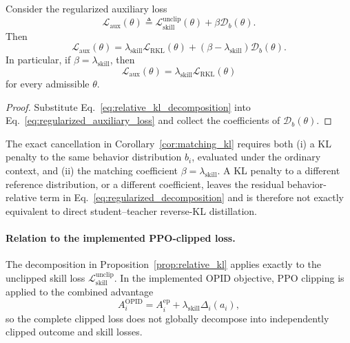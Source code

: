 \begin{corollary}
\label{cor:matching_kl}
Consider the regularized auxiliary loss
\begin{equation}
 \mathcal L_{\mathrm{aux}}(\theta)
 \triangleq
 \mathcal L_{\mathrm{skill}}^{\mathrm{unclip}}(\theta)
 +
 \beta\mathcal D_b(\theta).
\label{eq:regularized_auxiliary_loss}
\end{equation}
Then
\begin{equation}
 \mathcal L_{\mathrm{aux}}(\theta)
 =
 \lambda_{\mathrm{skill}}
 \mathcal L_{\mathrm{RKL}}(\theta)
 +
 \left(
   \beta-\lambda_{\mathrm{skill}}
 \right)
 \mathcal D_b(\theta).
\label{eq:regularized_decomposition}
\end{equation}
In particular, if
\(\beta=\lambda_{\mathrm{skill}}\), then
\begin{equation*}
 \mathcal L_{\mathrm{aux}}(\theta)
 =
 \lambda_{\mathrm{skill}}
 \mathcal L_{\mathrm{RKL}}(\theta)
\end{equation*}
for every admissible \(\theta\).
\end{corollary}


\begin{proof}
Substitute Eq.~\ref{eq:relative_kl_decomposition} into
Eq.~\ref{eq:regularized_auxiliary_loss} and collect the coefficients of
\(\mathcal D_b(\theta)\).
\end{proof}

The exact cancellation in Corollary~\ref{cor:matching_kl} requires both
(i) a KL penalty to the same behavior distribution \(b_i\), evaluated under
the ordinary context, and
(ii) the matching coefficient
\(\beta=\lambda_{\mathrm{skill}}\).
A KL penalty to a different reference distribution, or a different
coefficient, leaves the residual behavior-relative term in
Eq.~\ref{eq:regularized_decomposition} and is therefore not exactly
equivalent to direct student--teacher reverse-KL distillation.


\paragraph{Relation to the implemented PPO-clipped loss.}

The decomposition in Proposition~\ref{prop:relative_kl} applies exactly to
the unclipped skill loss
\(\mathcal L_{\mathrm{skill}}^{\mathrm{unclip}}\).
In the implemented OPID objective, PPO clipping is applied to the combined
advantage
\[
 A_i^{\mathrm{OPID}}
 =
 A_i^{\mathrm{ep}}
 +
 \lambda_{\mathrm{skill}}\Delta_i(a_i),
\]
so the complete clipped loss does not globally decompose into independently
clipped outcome and skill losses.

